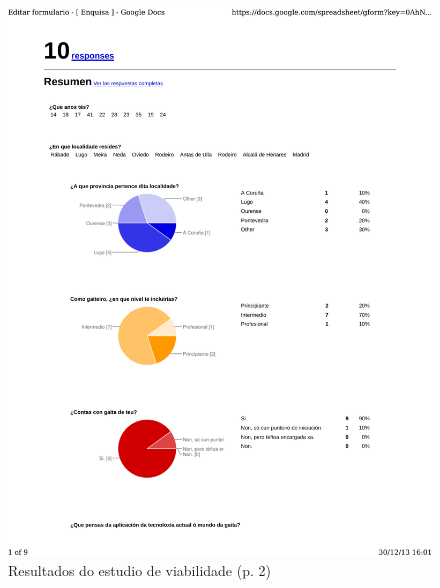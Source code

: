 \begin{figure}[htbp]
 \centering
 \includegraphics[scale=0.7,page=2,keepaspectratio=true]{./imagenes/enquisa.pdf}
 \caption{Resultados do estudio de viabilidade (p. 2)}
 \label{figura:ResultadosEstudioViabilidade2}
\end{figure}

